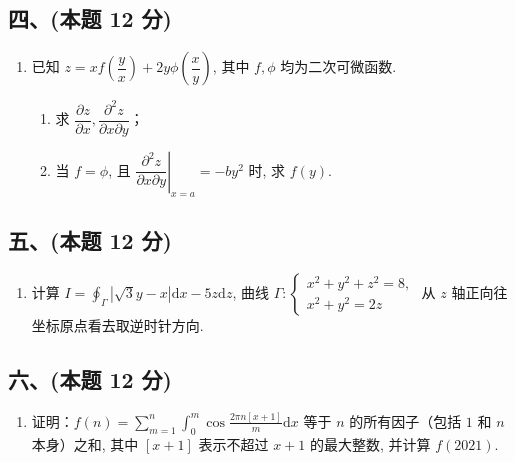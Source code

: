 \subsection*{四、(本题 12 分)}
\begin{enumerate}[start=8]
    \item 已知 $z = x f\left(\dfrac{y}{x}\right) + 2y\phi\left(\dfrac{x}{y}\right)$, 其中 $f,  \phi$ 均为二次可微函数.
          \begin{enumerate}
              \item [(1)] 求 $\dfrac{\partial z}{\partial x},  \dfrac{\partial^2 z}{\partial x \partial y}$；
              \item [(2)] 当 $f = \phi$, 且 $\left.\dfrac{\partial^2 z}{\partial x \partial y}\right|_{x=a} = -by^2$ 时, 求 $f(y)$.
          \end{enumerate}
\end{enumerate}

\subsection*{五、(本题 12 分)}
\begin{enumerate}[start=9]
    \item 计算 $I = \displaystyle\oint_{\Gamma} |\sqrt{3}y - x|  \mathrm{d}x - 5z  \mathrm{d}z$, 曲线 $\Gamma: \left\{\begin{array}{l}x^2 + y^2 + z^2 = 8,  \\ x^2 + y^2 = 2z\end{array}\right.$ 从 $z$ 轴正向往坐标原点看去取逆时针方向.
\end{enumerate}

\subsection*{六、(本题 12 分)}
\begin{enumerate}[start=10]
    \item 证明：$f(n) = \displaystyle\sum_{m=1}^{n} \int_{0}^{m} \cos \frac{2\pi n[x+1]}{m} \mathrm{d}x$ 等于 $n$ 的所有因子（包括 $1$ 和 $n$ 本身）之和, 其中 $[x+1]$ 表示不超过 $x+1$ 的最大整数, 并计算 $f(2021)$.
\end{enumerate}

